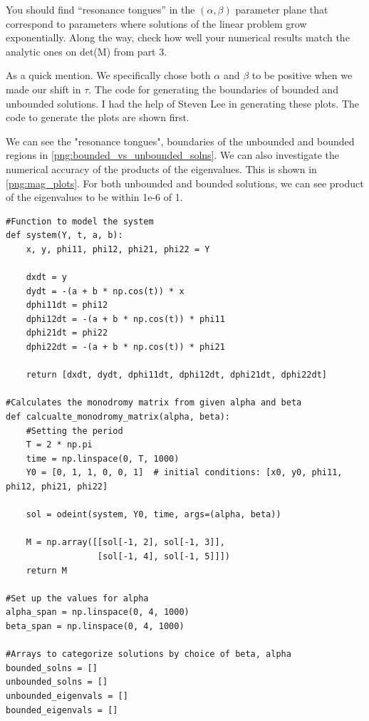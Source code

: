 \documentclass[12pt]{article}
\newcommand{\jump}{\vspace{5mm}}
\begin{document}
\begin{enumerate}[]
You should find “resonance tongues” in the $(\alpha, \beta)$ parameter plane that correspond to parameters where solutions of the linear problem grow exponentially. Along the way, check how
well your numerical results match the analytic ones on det(M) from part 3.

\begin{solution}

    As a quick mention. We specifically chose both $\alpha$ and $\beta$ to be positive when we made our shift in $\tau$. The code for generating the boundaries of bounded and unbounded solutions. I had the help of Steven Lee in generating these plots. The code to generate the plots are shown first.

    We can see the "resonance tongues", boundaries of the unbounded and bounded regions in \ref{png:bounded_vs_unbounded_solns}. We can also investigate the numerical accuracy of the products of the eigenvalues. This is shown in \ref{png:mag_plots}. For both unbounded and bounded solutions, we can see product of the eigenvalues to be within 1e-6 of 1. 
\end{solution}
\jump

\begin{lstlisting}
#Function to model the system
def system(Y, t, a, b):
    x, y, phi11, phi12, phi21, phi22 = Y

    dxdt = y
    dydt = -(a + b * np.cos(t)) * x
    dphi11dt = phi12
    dphi12dt = -(a + b * np.cos(t)) * phi11
    dphi21dt = phi22
    dphi22dt = -(a + b * np.cos(t)) * phi21

    return [dxdt, dydt, dphi11dt, dphi12dt, dphi21dt, dphi22dt]
    
#Calculates the monodromy matrix from given alpha and beta
def calcualte_monodromy_matrix(alpha, beta):
    #Setting the period
    T = 2 * np.pi
    time = np.linspace(0, T, 1000)
    Y0 = [0, 1, 1, 0, 0, 1]  # initial conditions: [x0, y0, phi11, phi12, phi21, phi22]

    sol = odeint(system, Y0, time, args=(alpha, beta))

    M = np.array([[sol[-1, 2], sol[-1, 3]],
                  [sol[-1, 4], sol[-1, 5]]])
    return M

#Set up the values for alpha
alpha_span = np.linspace(0, 4, 1000)
beta_span = np.linspace(0, 4, 1000)

#Arrays to categorize solutions by choice of beta, alpha
bounded_solns = []
unbounded_solns = []
unbounded_eigenvals = []
bounded_eigenvals = []


\end{lstlisting}
\end{enumerate}
\end{document}
